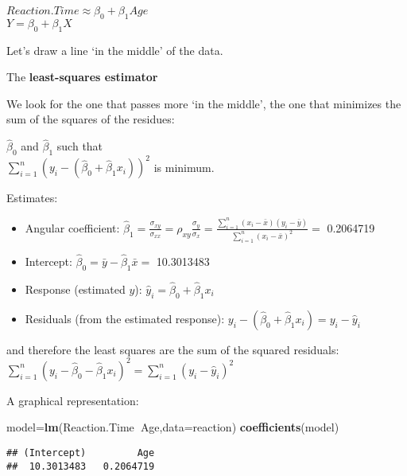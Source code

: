 \documentclass[
]{article}
\newenvironment{Shaded}{\begin{snugshade}}{\end{snugshade}}
\newcommand{\DataTypeTok}[1]{\textcolor[rgb]{0.13,0.29,0.53}{#1}}
\newcommand{\KeywordTok}[1]{\textcolor[rgb]{0.13,0.29,0.53}{\textbf{#1}}}
\newcommand{\NormalTok}[1]{#1}
\newcommand{\OperatorTok}[1]{\textcolor[rgb]{0.81,0.36,0.00}{\textbf{#1}}}
\providecommand{\tightlist}{%
  \setlength{\itemsep}{0pt}\setlength{\parskip}{0pt}}
\begin{document}
\(Reaction.Time \approx \beta_0 + \beta_1 Age\)\\
\(Y=\beta_0 + \beta_1X\)

Let's draw a line `in the middle' of the data.

The \textbf{least-squares estimator}

We look for the one that passes more `in the middle', the one that
minimizes the sum of the squares of the residues:

\(\hat{\beta}_0\) and \(\hat{\beta}_1\) such that\\
\(\sum_{i=1} ^ n (y_i - (\hat{\beta}_0 + \hat{\beta}_1x_i )) ^ 2\) is
minimum.

Estimates:

\begin{itemize}
\tightlist
\item
  Angular coefficient:
  \(\hat{\beta}_1=\frac{\sigma_{xy}}{\sigma_{xx}}=\rho_{xy}\frac{\sigma_{y}}{\sigma_{x}}=\frac{\sum_{i=1}^n(x_i- \bar{x})(y_i-\bar{y})}{\sum_{i=1}^n (x_i-\bar{x})^2}=\)
  0.2064719\\
\item
  Intercept: \(\hat{\beta}_0=\bar{y}-\hat{\beta}_1\bar{x}=\) 10.3013483
\item
  Response (estimated \(y\)):
  \(\hat{y}_i=\hat{\beta}_0 + \hat{\beta}_1x_i\)
\item
  Residuals (from the estimated response):
  \(y_i - (\hat{\beta}_0 + \hat{\beta}_1 x_i)=y_i- \hat{y}_i\)
\end{itemize}

and therefore the least squares are the sum of the squared residuals:
\(\sum_{i=1} ^ n (y_i- \hat{\beta}_0 - \hat{\beta}_1x_i) ^ 2=\sum_{i=1} ^ n (y_i- \hat{y}_i ) ^ 2\)

A graphical representation:

\begin{Shaded}
\begin{Highlighting}[]
\NormalTok{model=}\KeywordTok{lm}\NormalTok{(Reaction.Time}\OperatorTok{~}\NormalTok{Age,}\DataTypeTok{data=}\NormalTok{reaction)}
\KeywordTok{coefficients}\NormalTok{(model)}
\end{Highlighting}
\end{Shaded}

\begin{verbatim}
## (Intercept)         Age 
##  10.3013483   0.2064719
\end{verbatim}
\end{document}
